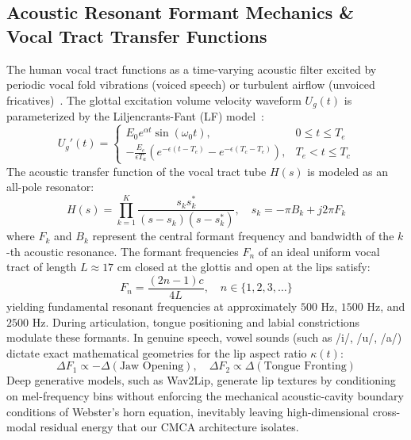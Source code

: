 \documentclass[journal]{IEEEtran}
\begin{document}
\subsection{Acoustic Resonant Formant Mechanics \& Vocal Tract Transfer Functions}
The human vocal tract functions as a time-varying acoustic filter excited by periodic vocal fold vibrations (voiced speech) or turbulent airflow (unvoiced fricatives)~\cite{fant1960acoustic}. The glottal excitation volume velocity waveform $U_g(t)$ is parameterized by the Liljencrants-Fant (LF) model~\cite{liljencrants1985computerized}:
\begin{equation}
U_g'(t) = \begin{cases}
E_0 e^{\alpha t} \sin(\omega_0 t), & 0 \le t \le T_e \\
-\frac{E_e}{\epsilon T_a} \left( e^{-\epsilon (t - T_e)} - e^{-\epsilon (T_c - T_e)} \right), & T_e < t \le T_c
\end{cases}
\end{equation}
The acoustic transfer function of the vocal tract tube $H(s)$ is modeled as an all-pole resonator:
\begin{equation}
H(s) = \prod_{k=1}^K \frac{s_k s_k^*}{(s - s_k)(s - s_k^*)}, \quad s_k = -\pi B_k + j 2\pi F_k
\end{equation}
where $F_k$ and $B_k$ represent the central formant frequency and bandwidth of the $k$-th acoustic resonance. The formant frequencies $F_n$ of an ideal uniform vocal tract of length $L \approx 17\text{ cm}$ closed at the glottis and open at the lips satisfy:
\begin{equation}
F_n = \frac{(2n - 1)c}{4L}, \quad n \in \{1, 2, 3, \dots\}
\end{equation}
yielding fundamental resonant frequencies at approximately $500\text{ Hz}$, $1500\text{ Hz}$, and $2500\text{ Hz}$. During articulation, tongue positioning and labial constrictions modulate these formants. In genuine speech, vowel sounds (such as /i/, /u/, /a/) dictate exact mathematical geometries for the lip aspect ratio $\kappa(t)$:
\begin{equation}
\Delta F_1 \propto -\Delta (\text{Jaw Opening}), \quad \Delta F_2 \propto \Delta (\text{Tongue Fronting})
\end{equation}
Deep generative models, such as Wav2Lip, generate lip textures by conditioning on mel-frequency bins without enforcing the mechanical acoustic-cavity boundary conditions of Webster's horn equation, inevitably leaving high-dimensional cross-modal residual energy that our CMCA architecture isolates.
\end{document}
